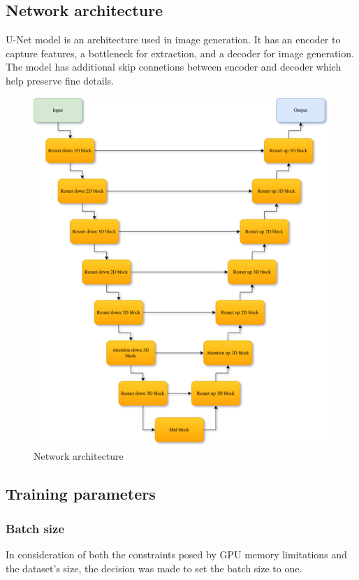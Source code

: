 \documentclass[11pt,a4paper]{report}
\begin{document}
\subsection{Network architecture}
U-Net model is an architecture used in image generation. It has an encoder to capture features, a bottleneck for extraction, and a decoder for image generation. The model has additional skip connetions between encoder and decoder which help preserve fine details.
\begin{figure}[H]
	\centering
	\includegraphics[scale=0.5]{images/ModelGraph.drawio}
    \caption{Network architecture}
\end{figure}
\subsection{Training parameters}
\subsubsection{Batch size}
In consideration of both the constraints posed by GPU memory limitations and the dataset's size, the decision was made to set the batch size to one.
\end{document}
